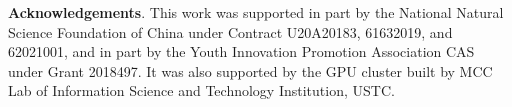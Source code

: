 \documentclass[10pt,twocolumn,letterpaper]{article}
\begin{document}
\footnotesize {\flushleft \bf Acknowledgements}.
This work was supported in part by the National Natural Science Foundation of China under Contract U20A20183, 61632019, and 62021001, and in part by the Youth Innovation Promotion Association CAS under Grant 2018497. It was also supported by the GPU cluster built by MCC Lab of Information Science and Technology Institution, USTC.


{\small


}
\end{document}
